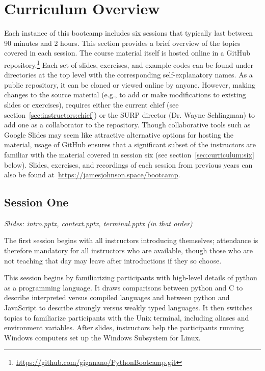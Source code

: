 
\section{Curriculum Overview}
\label{sec:curriculum}
\noindent
Each instance of this bootcamp includes six sessions that typically last
between 90 minutes and 2 hours.
This section provides a brief overview of the topics covered in each session.
The course material itself is hosted online in a GitHub repository.\footnote{
	\url{https://github.com/giganano/PythonBootcamp.git}
}
Each set of slides, exercises, and example codes can be found under directories
at the top level with the corresponding self-explanatory names.
As a public repository, it can be cloned or viewed online by anyone.
However, making changes to the source material (e.g., to add or make
modifications to existing slides or exercises), requires either the current
chief (see section~\ref{sec:instructors:chief}) or the SURP director (Dr. Wayne
Schlingman) to add one as a collaborator to the repository.
Though collaborative tools such as Google Slides may seem like attractive
alternative options for hosting the material, usage of GitHub ensures that a
significant subset of the instructors are familiar with the material covered in
session six (see section~\ref{sec:curriculum:six} below).
Slides, exercises, and recordings of each session from previous years can also
be found at~\url{https://jamesjohnson.space/bootcamp}.

\subsection{Session One}
\label{sec:curriculum:one}
\noindent
\textit{Slides: intro.pptx, context.pptx, terminal.pptx (in that order)}
\par\noindent
The first session begins with all instructors introducing themselves;
attendance is therefore mandatory for all instructors who are available, though
those who are not teaching that day may leave after introductions if they so
choose.
\par
This session begins by familiarizing participants with high-level details of
python as a programming language.
It draws comparisons between python and C to describe interpreted versus
compiled languages and between python and JavaScript to describe strongly
versus weakly typed languages.
It then switches topics to familiarize participants with the Unix terminal,
including aliases and environment variables.
After slides, instructors help the participants running Windows computers set
up the Windows Subsystem for Linux.

